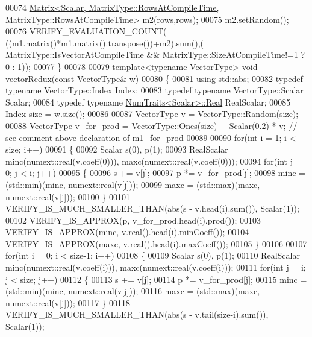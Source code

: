 \begin{DoxyCode}
00074   \hyperlink{group___core___module_class_eigen_1_1_matrix}{Matrix<Scalar, MatrixType::RowsAtCompileTime, MatrixType::RowsAtCompileTime>}
       m2(rows,rows);
00075   m2.setRandom();
00076   VERIFY\_EVALUATION\_COUNT( ((m1.matrix()*m1.matrix().transpose())+m2).sum(),(
      MatrixType::IsVectorAtCompileTime && MatrixType::SizeAtCompileTime!=1 ? 0 : 1));
00077 \}
00078 
00079 \textcolor{keyword}{template}<\textcolor{keyword}{typename} VectorType> \textcolor{keywordtype}{void} vectorRedux(\textcolor{keyword}{const} \hyperlink{struct_vector_type}{VectorType}& w)
00080 \{
00081   \textcolor{keyword}{using} std::abs;
00082   \textcolor{keyword}{typedef} \textcolor{keyword}{typename} VectorType::Index Index;
00083   \textcolor{keyword}{typedef} \textcolor{keyword}{typename} VectorType::Scalar Scalar;
00084   \textcolor{keyword}{typedef} \textcolor{keyword}{typename} \hyperlink{group___core___module_struct_eigen_1_1_num_traits}{NumTraits<Scalar>::Real} RealScalar;
00085   Index size = w.size();
00086 
00087   \hyperlink{struct_vector_type}{VectorType} v = VectorType::Random(size);
00088   \hyperlink{struct_vector_type}{VectorType} v\_for\_prod = VectorType::Ones(size) + Scalar(0.2) * v; \textcolor{comment}{// see comment above
       declaration of m1\_for\_prod}
00089 
00090   \textcolor{keywordflow}{for}(\textcolor{keywordtype}{int} i = 1; i < size; i++)
00091   \{
00092     Scalar s(0), p(1);
00093     RealScalar minc(numext::real(v.coeff(0))), maxc(numext::real(v.coeff(0)));
00094     \textcolor{keywordflow}{for}(\textcolor{keywordtype}{int} j = 0; j < i; j++)
00095     \{
00096       s += v[j];
00097       p *= v\_for\_prod[j];
00098       minc = (std::min)(minc, numext::real(v[j]));
00099       maxc = (std::max)(maxc, numext::real(v[j]));
00100     \}
00101     VERIFY\_IS\_MUCH\_SMALLER\_THAN(abs(s - v.head(i).sum()), Scalar(1));
00102     VERIFY\_IS\_APPROX(p, v\_for\_prod.head(i).prod());
00103     VERIFY\_IS\_APPROX(minc, v.real().head(i).minCoeff());
00104     VERIFY\_IS\_APPROX(maxc, v.real().head(i).maxCoeff());
00105   \}
00106 
00107   \textcolor{keywordflow}{for}(\textcolor{keywordtype}{int} i = 0; i < size-1; i++)
00108   \{
00109     Scalar s(0), p(1);
00110     RealScalar minc(numext::real(v.coeff(i))), maxc(numext::real(v.coeff(i)));
00111     \textcolor{keywordflow}{for}(\textcolor{keywordtype}{int} j = i; j < size; j++)
00112     \{
00113       s += v[j];
00114       p *= v\_for\_prod[j];
00115       minc = (std::min)(minc, numext::real(v[j]));
00116       maxc = (std::max)(maxc, numext::real(v[j]));
00117     \}
00118     VERIFY\_IS\_MUCH\_SMALLER\_THAN(abs(s - v.tail(size-i).sum()), Scalar(1));

\end{DoxyCode}
